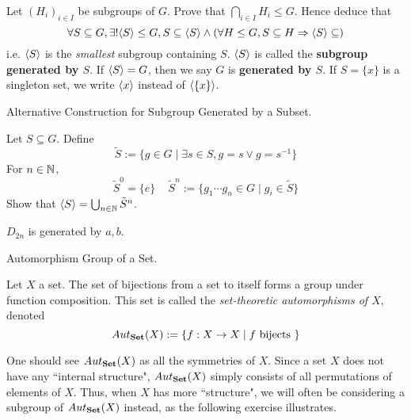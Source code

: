 \documentclass[../../book.tex]{subfiles}
\begin{document}
\begin{ex}
    
    Let $(H_i)_{i \in I}$ be subgroups of $G$. 
    Prove that $\bigcap_{i \in I} H_i \leq G$. 
    Hence deduce that 
    \[
        \forall S \subseteq G, \exists ! \langle S\rangle \leq G, 
        S \subseteq \langle S \rangle \land 
        \left(\forall H \leq G, S \subseteq H \Rightarrow \langle S \rangle \subseteq \right) 
    \]
    i.e. $\langle S \rangle$ is the \emph{smallest} subgroup containing $S$.
    $\langle S \rangle$ is called the \textbf{subgroup generated by $S$}. 
    If $\langle S\rangle = G$, then we say $G$ is \textbf{generated by $S$}.
    If $S = \{x\}$ is a singleton set, 
    we write $\langle x \rangle$ instead of $\langle \{x\} \rangle$. 
    
\end{ex}
\begin{ex} Alternative Construction for Subgroup Generated by a Subset.

    Let $S \subseteq G$. 
    Define \[
        \tilde{S} := \{g \in G \mid \exists s \in S, g = s \lor g = s^{-1}\}
    \]
    For $n \in \mathbb{N}$, 
    \[
        \tilde{S}^0 = \{e\} \,\,\,\,\,\,\,
        \tilde{S}^n := \{g_1\cdots g_n \in G \mid g_i \in \tilde{S}\}
    \]
    Show that $\langle S \rangle = \bigcup_{n \in \mathbb{N}} \tilde{S}^n$. 
\end{ex}
\begin{eg} 
    $D_{2n}$ is generated by $a, b$. 
\end{eg}
\begin{dfn} Automorphism Group of a Set. 

    Let $X$ a set. 
    The set of bijections from a set to itself
    forms a group under function composition. 
    This set is called the \emph{set-theoretic automorphisms of $X$}, denoted
    \[Aut_{\mathbf{Set}}(X) := \{f : X \to X \mid f \text{ bijects }\}\] 
\end{dfn}

\begin{rmk}

    One should see $Aut_{\mathbf{Set}}(X)$ as all the symmetries of $X$. 
    Since a set $X$ does not have any ``internal structure", 
    $Aut_{\mathbf{Set}}(X)$ simply consists of all permutations of elements of $X$. 
    Thus, when $X$ has more ``structure", 
    we will often be considering a subgroup of $Aut_{\mathbf{Set}}(X)$ instead, 
    as the following exercise illustrates. 
    
\end{rmk}
\end{document}
